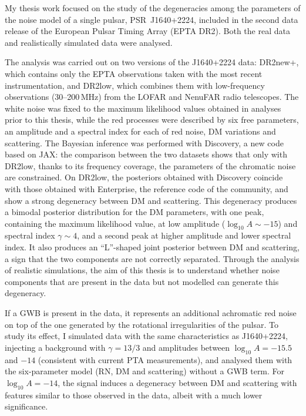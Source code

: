 \documentclass[12pt]{report}
\begin{document}
My thesis work focused on the study of the degeneracies among the parameters of
the noise model of a single pulsar, PSR~J1640+2224, included in the second data
release of the European Pulsar Timing Array (EPTA DR2). Both the real data and
realistically simulated data were analysed. \par

The analysis was carried out on two versions of the J1640+2224 data: DR2new+,
which contains only the EPTA observations taken with the most recent
instrumentation, and DR2low, which combines them with low-frequency observations
(30--200\,MHz) from the LOFAR and NenuFAR radio telescopes. The white noise was
fixed to the maximum likelihood values obtained in analyses prior to this
thesis, while the red processes were described by six free parameters, an
amplitude and a spectral index for each of red noise, DM variations and
scattering. The Bayesian inference was performed with Discovery, a new code
based on JAX: the comparison between the two datasets shows that only with
DR2low, thanks to its frequency coverage, the parameters of the chromatic noise
are constrained. On DR2low, the posteriors obtained with Discovery coincide with
those obtained with Enterprise, the reference code of the community, and show a
strong degeneracy between DM and scattering. This degeneracy produces a bimodal
posterior distribution for the DM parameters, with one peak, containing the
maximum likelihood value, at low amplitude ($\log_{10}A \sim -15$) and spectral
index $\gamma \sim 4$, and a second peak at higher amplitude and lower spectral
index. It also produces an ``L''-shaped joint posterior between DM and
scattering, a sign that the two components are not correctly separated. Through
the analysis of realistic simulations, the aim of this thesis is to understand
whether noise components that are present in the data but not modelled can
generate this degeneracy. \par

If a GWB is present in the data, it represents an additional achromatic red
noise on top of the one generated by the rotational irregularities of the
pulsar. To study its effect, I simulated data with the same characteristics as
J1640+2224, injecting a background with $\gamma = 13/3$ and amplitudes between
$\log_{10}A = -15.5$ and $-14$ (consistent with current PTA measurements), and
analysed them with the six-parameter model (RN, DM and scattering) without a
GWB term. For $\log_{10}A = -14$, the signal induces a degeneracy between DM and
scattering with features similar to those observed in the data, albeit with a
much lower significance. \par
\end{document}
